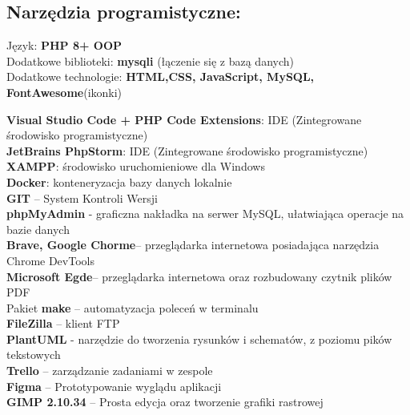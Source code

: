 \subsection{Narzędzia programistyczne:}
    \begin{flushleft}
        Język: \textbf{PHP 8+ OOP} \\
        Dodatkowe biblioteki: \textbf{mysqli} (łączenie się z bazą danych)\\
        Dodatkowe technologie: \textbf{HTML,CSS, JavaScript, MySQL, FontAwesome}(ikonki) \newline\newline

        \textbf{Visual Studio Code + PHP Code Extensions}: IDE (Zintegrowane środowisko programistyczne)\\
        \textbf{JetBrains PhpStorm}: IDE (Zintegrowane środowisko programistyczne)\\
        \textbf{XAMPP}: środowisko uruchomieniowe dla Windows \\
        \textbf{Docker}: konteneryzacja bazy danych lokalnie\\
        \textbf{GIT} – System Kontroli Wersji\\
        \textbf{phpMyAdmin} - graficzna nakładka na serwer MySQL, ułatwiająca operacje na bazie danych\\
        \textbf{Brave, Google Chorme}– przeglądarka internetowa posiadająca narzędzia Chrome DevTools \\
        \textbf{Microsoft Egde}– przeglądarka internetowa oraz rozbudowany czytnik plików PDF \\
        Pakiet \textbf{make} – automatyzacja poleceń w terminalu\\
        \textbf{FileZilla} – klient FTP\\
        \textbf{PlantUML} - narzędzie do tworzenia rysunków i schematów, z poziomu pików tekstowych\\
        \textbf{Trello} – zarządzanie zadaniami w zespole\\
        \textbf{Figma} – Prototypowanie wyglądu aplikacji \\
        \textbf{GIMP 2.10.34} – Prosta edycja oraz tworzenie grafiki rastrowej \\


    \end{flushleft}
\pagebreak

